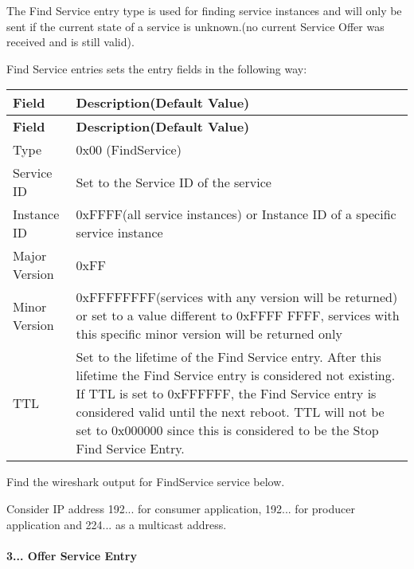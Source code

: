 \begin{DoxyItemize}
\item The Find Service entry type is used for finding service instances and will only be sent if the current state of a service is unknown.(no current Service Offer was received and is still valid).
\item Find Service entries sets the entry fields in the following way\+: \tabulinesep=1mm
\begin{longtabu} spread 0pt [c]{*{2}{|X[-1]}|}
\hline
\rowcolor{\tableheadbgcolor}\textbf{ Field }&\textbf{ Description(\+Default Value)  }\\
\endfirsthead
\hline
\endfoot
\hline
\rowcolor{\tableheadbgcolor}\textbf{ Field }&\textbf{ Description(\+Default Value)  }\\
\endhead
Type &0x00 (Find\+Service) \\
Service ID &Set to the Service ID of the service \\
Instance ID &0x\+F\+F\+FF(all service instances) or Instance ID of a specific service instance \\
Major Version &0x\+FF \\
Minor Version &0x\+F\+F\+F\+F\+F\+F\+FF(services with any version will be returned) or set to a value different to 0x\+F\+F\+FF F\+F\+FF, services with this specific minor version will be returned only \\
T\+TL &Set to the lifetime of the Find Service entry. After this lifetime the Find Service entry is considered not existing. If T\+TL is set to 0x\+F\+F\+F\+F\+FF, the Find Service entry is considered valid until the next reboot. T\+TL will not be set to 0x000000 since this is considered to be the Stop Find Service Entry. \\
\end{longtabu}

\item Find the wireshark output for Find\+Service service below.
\item Consider IP address 192... for consumer application, 192... for producer application and 224... as a multicast address.
\end{DoxyItemize}

 \paragraph*{3... Offer Service Entry}


